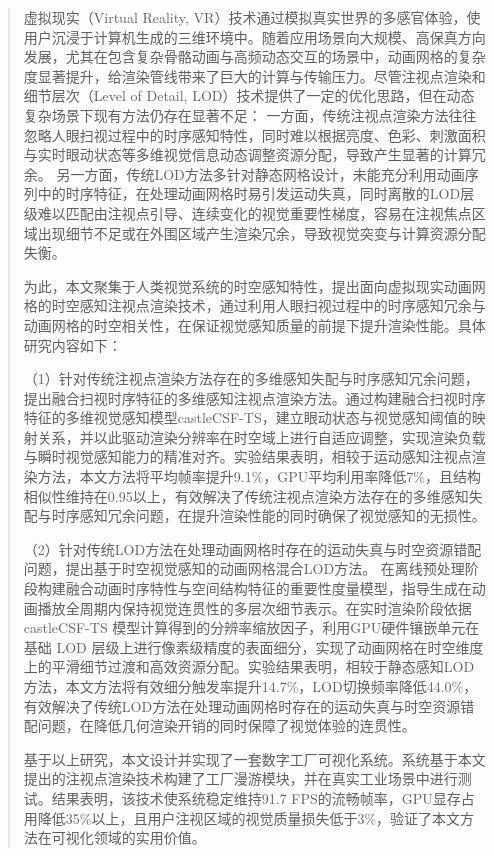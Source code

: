 \begin{abstract}

虚拟现实（Virtual Reality, VR）技术通过模拟真实世界的多感官体验，使用户沉浸于计算机生成的三维环境中。随着应用场景向大规模、高保真方向发展，尤其在包含复杂骨骼动画与高频动态交互的场景中，动画网格的复杂度显著提升，给渲染管线带来了巨大的计算与传输压力。尽管注视点渲染和细节层次（Level of Detail, LOD）技术提供了一定的优化思路，但在动态复杂场景下现有方法仍存在显著不足：
一方面，传统注视点渲染方法往往忽略人眼扫视过程中的时序感知特性，同时难以根据亮度、色彩、刺激面积与实时眼动状态等多维视觉信息动态调整资源分配，导致产生显著的计算冗余。
另一方面，传统LOD方法多针对静态网格设计，未能充分利用动画序列中的时序特征，在处理动画网格时易引发运动失真，同时离散的LOD层级难以匹配由注视点引导、连续变化的视觉重要性梯度，容易在注视焦点区域出现细节不足或在外围区域产生渲染冗余，导致视觉突变与计算资源分配失衡。

为此，本文聚集于人类视觉系统的时空感知特性，提出面向虚拟现实动画网格的时空感知注视点渲染技术，通过利用人眼扫视过程中的时序感知冗余与动画网格的时空相关性，在保证视觉感知质量的前提下提升渲染性能。具体研究内容如下：

（1）针对传统注视点渲染方法存在的多维感知失配与时序感知冗余问题，提出融合扫视时序特征的多维感知注视点渲染方法。通过构建融合扫视时序特征的多维视觉感知模型castleCSF-TS，建立眼动状态与视觉感知阈值的映射关系，并以此驱动渲染分辨率在时空域上进行自适应调整，实现渲染负载与瞬时视觉感知能力的精准对齐。实验结果表明，相较于运动感知注视点渲染方法，本文方法将平均帧率提升9.1\%，GPU平均利用率降低7\%，且结构相似性维持在0.95以上，有效解决了传统注视点渲染方法存在的多维感知失配与时序感知冗余问题，在提升渲染性能的同时确保了视觉感知的无损性。

（2）针对传统LOD方法在处理动画网格时存在的运动失真与时空资源错配问题，提出基于时空视觉感知的动画网格混合LOD方法。
在离线预处理阶段构建融合动画时序特性与空间结构特征的重要性度量模型，指导生成在动画播放全周期内保持视觉连贯性的多层次细节表示。在实时渲染阶段依据castleCSF-TS 模型计算得到的分辨率缩放因子，利用GPU硬件镶嵌单元在基础 LOD 层级上进行像素级精度的表面细分，实现了动画网格在时空维度上的平滑细节过渡和高效资源分配。实验结果表明，相较于静态感知LOD方法，本文方法将有效细分触发率提升14.7\%，LOD切换频率降低44.0\%，有效解决了传统LOD方法在处理动画网格时存在的运动失真与时空资源错配问题，在降低几何渲染开销的同时保障了视觉体验的连贯性。

基于以上研究，本文设计并实现了一套数字工厂可视化系统。系统基于本文提出的注视点渲染技术构建了工厂漫游模块，并在真实工业场景中进行测试。结果表明，该技术使系统稳定维持91.7 FPS的流畅帧率，GPU显存占用降低35\%以上，且用户注视区域的视觉质量损失低于3\%，验证了本文方法在可视化领域的实用价值。

\par

\end{abstract}
